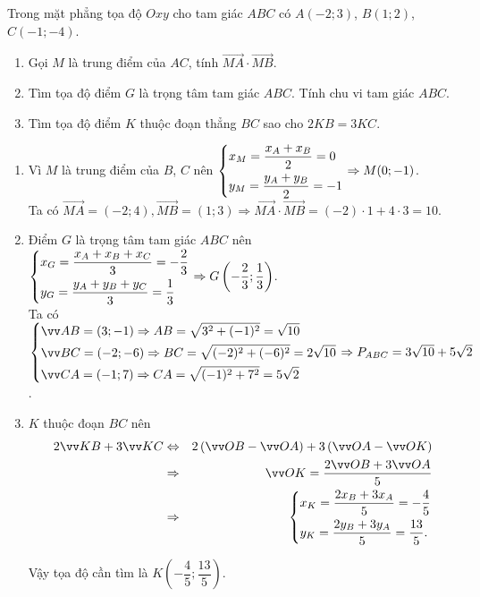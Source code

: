 \begin{bt}%
	Trong mặt phẳng tọa độ $Oxy$ cho tam giác $ABC$ có $A(-2;3)$, $B(1;2)$, $C(-1;-4)$.
	\begin{enumerate}
		\item Gọi $M$ là trung điểm của $AC$, tính $\overrightarrow{MA}\cdot \overrightarrow{MB}$.
		\item Tìm tọa độ điểm $G$ là trọng tâm tam giác $ABC$. Tính chu vi tam giác $ABC$.
		\item Tìm tọa độ điểm $K$ thuộc đoạn thẳng $BC$ sao cho $2KB=3KC$.
	\end{enumerate}
	\loigiai
	{
		\begin{enumerate}
			\item Vì $M$ là trung điểm của $B$, $C$ nên $\left\{\begin{aligned}&x_M=\dfrac{x_A+x_B}{2}=0\\&y_M=\dfrac{y_A+y_B}{2}=-1\end{aligned}\right.\Rightarrow M(0;-1)$.\\
			Ta có $\overrightarrow{MA}=(-2;4), \overrightarrow{MB}=(1;3)\Rightarrow \overrightarrow{MA}\cdot \overrightarrow{MB}=(-2)\cdot 1+4\cdot 3=10$.
			\item Điểm $G$ là trọng tâm tam giác $ABC$ nên $\left\{\begin{aligned}&x_G=\dfrac{x_A+x_B+x_C}{3}=-\dfrac{2}{3}\\&y_G=\dfrac{y_A+y_B+y_C}{3}=\dfrac{1}{3}\end{aligned}\right.\Rightarrow G\left(-\dfrac{2}{3};\dfrac{1}{3}\right)$.\\
			Ta có $\heva{&\overrightarrow{AB}=(3;-1)\Rightarrow AB=\sqrt{3^2+(-1)^2}=\sqrt{10} \\&\overrightarrow{BC}=(-2;-6)\Rightarrow BC=\sqrt{(-2)^2+(-6)^2}=2\sqrt{10}\\&\overrightarrow{CA}=(-1;7)\Rightarrow CA=\sqrt{(-1)^2+7^2}=5\sqrt{2}}\Rightarrow P_{ABC}=3\sqrt{10}+5\sqrt{2}$.
			\item $K$ thuộc đoạn $BC$ nên 
			\begin{eqnarray*}
				2\overrightarrow{KB}+3\overrightarrow{KC}&\Leftrightarrow &  2\left(\overrightarrow{OB}-\overrightarrow{OA}\right)+3\left(\overrightarrow{OA}-\overrightarrow{OK}\right)\\
				&\Rightarrow & \overrightarrow{OK}=\dfrac{2\overrightarrow{OB}+3\overrightarrow{OA}}{5}\\
				&\Rightarrow & \heva{&x_K=\dfrac{2x_B+3x_A}{5}=-\dfrac{4}{5}\\&y_K=\dfrac{2y_B+3y_A}{5}=\dfrac{13}{5}.}
			\end{eqnarray*}
			
			Vậy tọa độ cần tìm là $K\left(-\dfrac{4}{5};\dfrac{13}{5}\right).$
		\end{enumerate}
		
	}
\end{bt}
